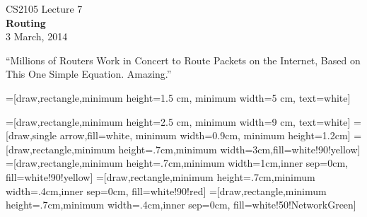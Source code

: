 \begin{cf}{
CS2105 Lecture 7\\
\large
\textbf{Routing\\[10pt]}
\normalsize
	3 March, 2014
}
\end{cf}

\begin{frame}
	``Millions of Routers Work in Concert to Route Packets on the Internet, Based on This One Simple Equation. Amazing.''
\end{frame}

\begin{cf}{
=[draw,rectangle,minimum height=1.5 cm, minimum width=5 cm, text=white]
}
\end{cf}

=[draw,rectangle,minimum height=2.5 cm, minimum width=9 cm, text=white]
=[draw,single arrow,fill=white, minimum width=0.9cm, minimum height=1.2cm]
=[draw,rectangle,minimum height=.7cm,minimum width=3cm,fill=white!90!yellow]
=[draw,rectangle,minimum height=.7cm,minimum width=1cm,inner sep=0cm, fill=white!90!yellow]
=[draw,rectangle,minimum height=.7cm,minimum width=.4cm,inner sep=0cm, fill=white!90!red]
=[draw,rectangle,minimum height=.7cm,minimum width=.4cm,inner sep=0cm, fill=white!50!NetworkGreen]


